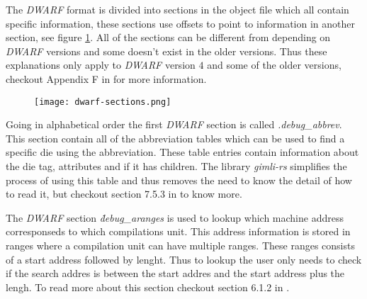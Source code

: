  


The \emph{DWARF} format is divided into sections in the object file which all contain specific information, these sections use offsets to point to information in another section, see figure \ref{fig:dwarfsections}.
All of the sections can be different from depending on \emph{DWARF} versions and some doesn't exist in the older versions.
Thus these explanations only apply to \emph{DWARF} version $4$ and some of the older versions, checkout Appendix F in \cite{dwarf} for more information.


\begin{figure}[h]
    \centering
    \texttt{[image: dwarf-sections.png]}
    \label{fig:dwarfsections}
\end{figure}


Going in alphabetical order the first \emph{DWARF} section is called \emph{.debug\_abbrev}.
This section contain all of the abbreviation tables which can be used to find a specific die using the abbreviation.
These table entries contain information about the die tag, attributes and if it has children.
The library \emph{gimli-rs} simplifies the process of using this table and thus removes the need to know the detail of how to read it, but checkout section 7.5.3 in \cite{dwarf} to know more.


The \emph{DWARF} section \emph{\.debug\_aranges} is used to lookup which machine address corresponseds to which compilations unit.
This address information is stored in ranges where a compilation unit can have multiple ranges.
These ranges consists of a start address followed by lenght.
Thus to lookup the user only needs to check if the search addres is between the start addres and the start address plus the lengh.
To read more about this section checkout section 6.1.2 in \cite{dwarf}.


